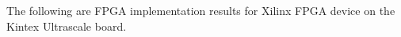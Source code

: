 The following are FPGA implementation results for Xilinx FPGA device on the Kintex Ultrascale board. 


